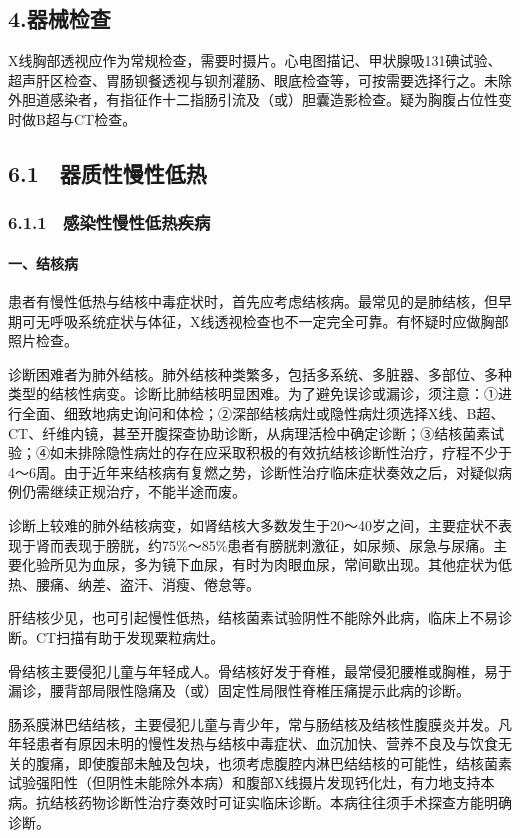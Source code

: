 \subsection{4.器械检查}

X线胸部透视应作为常规检查，需要时摄片。心电图描记、甲状腺吸131碘试验、超声肝区检查、胃肠钡餐透视与钡剂灌肠、眼底检查等，可按需要选择行之。未除外胆道感染者，有指征作十二指肠引流及（或）胆囊造影检查。疑为胸腹占位性变时做B超与CT检查。

\protect\hypertarget{text00039.html}{}{}

\subsection{6.1　器质性慢性低热}

\subsubsection{6.1.1　感染性慢性低热疾病}

\paragraph{一、结核病}

患者有慢性低热与结核中毒症状时，首先应考虑结核病。最常见的是肺结核，但早期可无呼吸系统症状与体征，X线透视检查也不一定完全可靠。有怀疑时应做胸部照片检查。

诊断困难者为肺外结核。肺外结核种类繁多，包括多系统、多脏器、多部位、多种类型的结核性病变。诊断比肺结核明显困难。为了避免误诊或漏诊，须注意：①进行全面、细致地病史询问和体检；②深部结核病灶或隐性病灶须选择X线、B超、CT、纤维内镜，甚至开腹探查协助诊断，从病理活检中确定诊断；③结核菌素试验；④如未排除隐性病灶的存在应采取积极的有效抗结核诊断性治疗，疗程不少于4～6周。由于近年来结核病有复燃之势，诊断性治疗临床症状奏效之后，对疑似病例仍需继续正规治疗，不能半途而废。

诊断上较难的肺外结核病变，如肾结核大多数发生于20～40岁之间，主要症状不表现于肾而表现于膀胱，约75\%～85\%患者有膀胱刺激征，如尿频、尿急与尿痛。主要化验所见为血尿，多为镜下血尿，有时为肉眼血尿，常间歇出现。其他症状为低热、腰痛、纳差、盗汗、消瘦、倦怠等。

肝结核少见，也可引起慢性低热，结核菌素试验阴性不能除外此病，临床上不易诊断。CT扫描有助于发现粟粒病灶。

骨结核主要侵犯儿童与年轻成人。骨结核好发于脊椎，最常侵犯腰椎或胸椎，易于漏诊，腰背部局限性隐痛及（或）固定性局限性脊椎压痛提示此病的诊断。

肠系膜淋巴结结核，主要侵犯儿童与青少年，常与肠结核及结核性腹膜炎并发。凡年轻患者有原因未明的慢性发热与结核中毒症状、血沉加快、营养不良及与饮食无关的腹痛，即使腹部未触及包块，也须考虑腹腔内淋巴结结核的可能性，结核菌素试验强阳性（但阴性未能除外本病）和腹部X线摄片发现钙化灶，有力地支持本病。抗结核药物诊断性治疗奏效时可证实临床诊断。本病往往须手术探查方能明确诊断。

